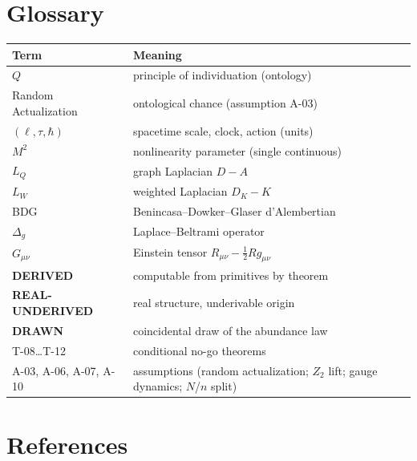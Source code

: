 \documentclass[10pt,twoside,openany]{book}
\newcommand{\derived}{\textbf{DERIVED}}
\newcommand{\realunder}{\textbf{REAL-UNDERIVED}}
\newcommand{\drawn}{\textbf{DRAWN}}
\begin{document}
\chapter{Glossary}
\label{app:glossary}

\begin{center}
\begin{tabular}{lp{10cm}}
\toprule
Term & Meaning \\
\midrule
$Q$ & principle of individuation (ontology) \\
Random Actualization & ontological chance (assumption A-03) \\
$(\ell,\tau,\hbar)$ & spacetime scale, clock, action (units) \\
$M^2$ & nonlinearity parameter (single continuous) \\
$L_Q$ & graph Laplacian $D-A$ \\
$L_W$ & weighted Laplacian $D_K-K$ \\
BDG & Benincasa--Dowker--Glaser d'Alembertian \\
$\Delta_g$ & Laplace--Beltrami operator \\
$G_{\mu\nu}$ & Einstein tensor $R_{\mu\nu}-\tfrac12 R g_{\mu\nu}$ \\
\derived & computable from primitives by theorem \\
\realunder & real structure, underivable origin \\
\drawn & coincidental draw of the abundance law \\
T-08\dots T-12 & conditional no-go theorems \\
A-03, A-06, A-07, A-10 & assumptions (random actualization; $Z_2$ lift; gauge dynamics; $N$/$n$ split) \\
\bottomrule
\end{tabular}
\end{center}


\chapter{References}
\label{app:references}
\end{document}
